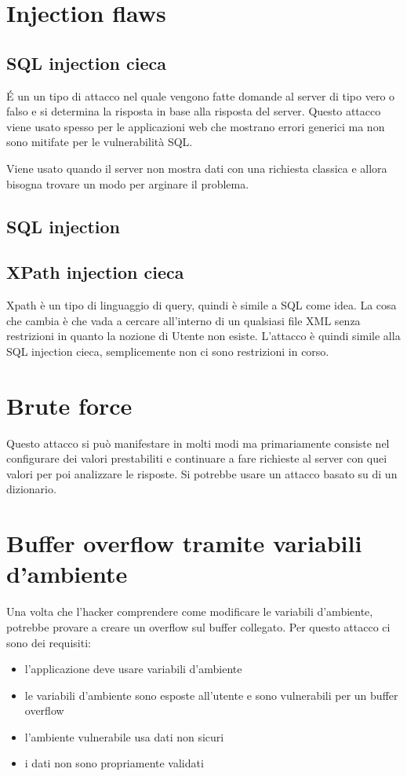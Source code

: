 \documentclass[11pt,a4paper]{book}
\begin{document}
\section{Injection flaws}
\subsection{SQL injection cieca}
É un un tipo di attacco nel quale vengono fatte domande al server di tipo vero o falso e si determina la risposta in base alla risposta del server. Questo attacco viene usato spesso per le applicazioni web che mostrano errori generici ma non sono mitifate per le vulnerabilità SQL.

Viene usato quando il server non mostra dati con una richiesta classica e allora bisogna trovare un modo per arginare il problema.
\subsection{SQL injection}
\subsection{XPath injection cieca}
Xpath è un tipo di linguaggio di query, quindi è simile a SQL come idea. La cosa che cambia è che vada a cercare all'interno di un qualsiasi file XML senza restrizioni in quanto la nozione di Utente non esiste. L'attacco è quindi simile alla SQL injection cieca, semplicemente non ci sono restrizioni in corso.
\section{Brute force}
Questo attacco si può manifestare in molti modi ma primariamente consiste nel configurare dei valori prestabiliti e continuare a fare richieste al server con quei valori per poi analizzare le risposte. Si potrebbe usare un attacco basato su di un dizionario.
\section{Buffer overflow tramite variabili d'ambiente}
Una volta che l'hacker comprendere come modificare le variabili d'ambiente, potrebbe provare a creare un overflow sul buffer collegato. Per questo attacco ci sono dei requisiti:
\begin{itemize}
	\item l'applicazione deve usare variabili d'ambiente
	\item le variabili d'ambiente sono esposte all'utente e sono vulnerabili per un buffer overflow
	\item l'ambiente vulnerabile usa dati non sicuri
	\item i dati non sono propriamente validati
\end{itemize}
\end{document}
